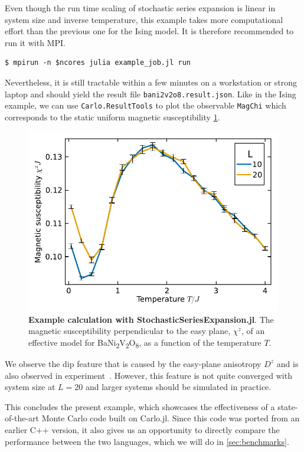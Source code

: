 \documentclass{SciPost}
\newcommand\banivo{BaNi\textsubscript{2}V\textsubscript{2}O\textsubscript{8}}
\begin{document}
Even though the run time scaling of stochastic series expansion is linear in system size and inverse temperature, this example takes more computational effort than the previous one for the Ising model. It is therefore recommended to run it with MPI.
\begin{lstlisting}
$ mpirun -n $ncores julia example_job.jl run
\end{lstlisting}
Nevertheless, it is still tractable within a few minutes on a workstation or strong laptop and should yield the result file \texttt{bani2v2o8.result.json}. Like in the Ising example, we can use \texttt{Carlo.ResultTools} to plot the observable \texttt{MagChi} which corresponds to the static uniform magnetic susceptibility \cref{fig:susceptibility}.
\begin{figure}
\begin{center}
\includegraphics[scale=0.625]{figs/bani2v2o8.pdf}
\end{center}
\caption{\textbf{Example calculation with StochasticSeriesExpansion.jl}. The magnetic susceptibility perpendicular to the easy plane, $\chi^z$, of an effective model for \banivo, as a function of the temperature $T$.}
\label{fig:susceptibility}
\end{figure}
We observe the dip feature that is caused by the easy-plane anisotropy $D^z$ and is also observed in experiment~\cite{Klyushina2021}. However, this feature is not quite converged with system size at $L=20$ and larger systems should be simulated in practice.

This concludes the present example, which showcases the effectiveness of a state-of-the-art Monte Carlo code built on Carlo.jl. Since this code was ported from an earlier C++ version, it also gives us an opportunity to directly compare the performance between the two languages, which we will do in \cref{sec:benchmarks}.
\end{document}
